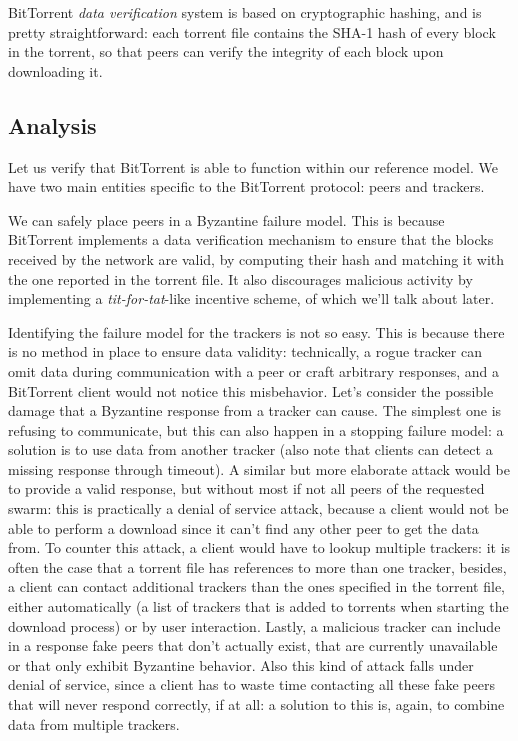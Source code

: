 \documentclass[mscthesis]{usiinfthesis}
\begin{document}
BitTorrent \emph{data verification} system is based on cryptographic hashing, and is pretty straightforward: each torrent file contains the SHA-1 hash of every block in the torrent, so that peers can verify the integrity of each block upon downloading it.

\subsection{Analysis}\label{sec:btanalysis}
Let us verify that BitTorrent is able to function within our reference model. We have two main entities specific to the BitTorrent protocol: peers and trackers. 

We can safely place peers in a Byzantine failure model. This is because BitTorrent implements a data verification mechanism to ensure that the blocks received by the network are valid, by computing their hash and matching it with the one reported in the torrent file. It also discourages malicious activity by implementing a \textit{tit-for-tat}-like incentive scheme, of which we'll talk about later.

Identifying the failure model for the trackers is not so easy. This is because there is no method in place to ensure data validity: technically, a rogue tracker can omit data during communication with a peer or craft arbitrary responses, and a BitTorrent client would not notice this misbehavior. Let's consider the possible damage that a Byzantine response from a tracker can cause. The simplest one is refusing to communicate, but this can also happen in a stopping failure model: a solution is to use data from another tracker (also note that clients can detect a missing response through timeout). A similar but more elaborate attack would be to provide a valid response, but without most if not all peers of the requested swarm: this is practically a denial of service attack, because a client would not be able to perform a download since it can't find any other peer to get the data from. To counter this attack, a client would have to lookup multiple trackers: it is often the case that a torrent file has references to more than one tracker, besides, a client can contact additional trackers than the ones specified in the torrent file, either automatically (a list of trackers that is added to torrents when starting the download process) or by user interaction. Lastly, a malicious tracker can include in a response fake peers that don't actually exist, that are currently unavailable or that only exhibit Byzantine behavior. Also this kind of attack falls under denial of service, since a client has to waste time contacting all these fake peers that will never respond correctly, if at all: a solution to this is, again, to combine data from multiple trackers.
\end{document}
